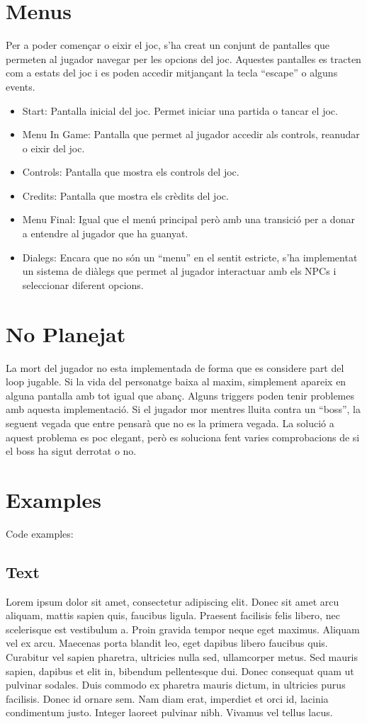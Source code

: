 \documentclass[a4paper,12pt]{article}
\begin{document}
\section{Menus}
Per a poder començar o eixir el joc, s'ha creat un conjunt de pantalles que permeten al jugador navegar per les opcions del joc. Aquestes pantalles es tracten com a estats del joc i es poden accedir mitjançant la tecla ``escape'' o alguns events.   
\begin{itemize}
    \item Start: Pantalla inicial del joc. Permet iniciar una partida o tancar el joc.
    \item Menu In Game: Pantalla que permet al jugador accedir als controls, reanudar o eixir del joc.
    \item Controls: Pantalla que mostra els controls del joc.
    \item Credits: Pantalla que mostra els crèdits del joc.
    \item Menu Final: Igual que el menú principal però amb una transició per a donar a entendre al jugador que ha guanyat.
    \item Dialegs: Encara que no són un ``menu'' en el sentit estricte, s'ha implementat un sistema de diàlegs que permet al jugador interactuar amb els NPCs i seleccionar diferent opcions.
\end{itemize}

\section{No Planejat}
La mort del jugador no esta implementada de forma que es considere part del loop jugable. Si la vida del personatge baixa al maxim, simplement apareix en alguna pantalla amb tot igual que abanç. Alguns triggers poden tenir problemes amb aquesta implementació. Si el jugador mor mentres lluita contra un ``boss'', la seguent vegada que entre pensarà que no es la primera vegada. La solució a aquest problema es poc elegant, però es soluciona fent varies comprobacions de si el boss ha sigut derrotat o no.






\section{Examples}
Code examples:
\subsection{Text}
 Lorem ipsum dolor sit amet, consectetur adipiscing elit. Donec sit amet arcu aliquam, mattis sapien quis, faucibus ligula. Praesent facilisis felis libero, nec scelerisque est vestibulum a. Proin gravida tempor neque eget maximus. Aliquam vel ex arcu. Maecenas porta blandit leo, eget dapibus libero faucibus quis. Curabitur vel sapien pharetra, ultricies nulla sed, ullamcorper metus. Sed mauris sapien, dapibus et elit in, bibendum pellentesque dui. Donec consequat quam ut pulvinar sodales. Duis commodo ex pharetra mauris dictum, in ultricies purus facilisis. Donec id ornare sem. Nam diam erat, imperdiet et orci id, lacinia condimentum justo. Integer laoreet pulvinar nibh. Vivamus vel tellus lacus.
\end{document}
